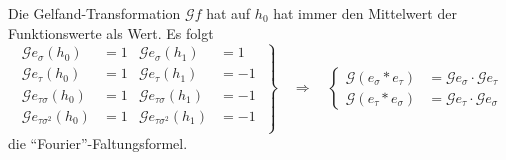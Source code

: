 \begin{loesung}
\begin{teilaufgaben}
Die Gelfand-Transformation $\mathscr{G}f$ hat auf $h_0$
hat immer den Mittelwert der Funktionswerte als Wert.
Es folgt
\[
\left.
\begin{aligned}
\mathscr{G}e_\sigma(h_0)         &= 1 & \mathscr{G}e_\sigma(h_1)         &=  1 \\
\mathscr{G}e_\tau(h_0)           &= 1 & \mathscr{G}e_\tau(h_1)           &= -1 \\
\mathscr{G}e_{\tau\sigma}(h_0)   &= 1 & \mathscr{G}e_{\tau\sigma}(h_1)   &= -1 \\
\mathscr{G}e_{\tau\sigma^2}(h_0) &= 1 & \mathscr{G}e_{\tau\sigma^2}(h_1) &= -1 \\
\end{aligned}
\;
\right\}
\quad\Rightarrow\quad
\left\{
\begin{aligned}
\mathscr{G}(e_\sigma*e_\tau) &= \mathscr{G}e_\sigma\cdot \mathscr{G}e_\tau \\
\mathscr{G}(e_\tau*e_\sigma) &= \mathscr{G}e_\tau\cdot \mathscr{G}e_\sigma 
\end{aligned}
\right.
\]
die ``Fourier''-Faltungsformel.
\end{teilaufgaben}
\end{loesung}
